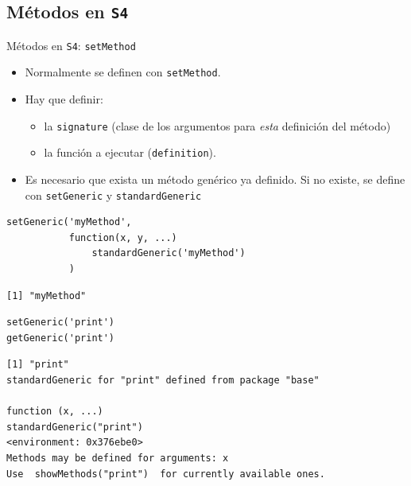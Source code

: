 \documentclass[xcolor={usenames,svgnames,dvipsnames}]{beamer}
\begin{document}
\subsection{Métodos en \texttt{S4}}
\label{sec:orgheadline36}

\begin{frame}[fragile,label={sec:orgheadline32}]{Métodos en \texttt{S4}: \texttt{setMethod}}
 \begin{itemize}
\item Normalmente se definen con \texttt{setMethod}.
\item Hay que definir:
\begin{itemize}
\item la \texttt{signature} (clase de los argumentos para \emph{esta} definición del
método)
\item la función a ejecutar (\texttt{definition}).
\end{itemize}
\item Es necesario que exista un método genérico ya definido. Si no
existe, se define con \texttt{setGeneric} y \texttt{standardGeneric}
\end{itemize}
\lstset{language=R,label= ,caption= ,captionpos=b,numbers=none}
\begin{lstlisting}
setGeneric('myMethod',
           function(x, y, ...)
               standardGeneric('myMethod')
           )
\end{lstlisting}

\begin{verbatim}
[1] "myMethod"
\end{verbatim}

\lstset{language=R,label= ,caption= ,captionpos=b,numbers=none}
\begin{lstlisting}
setGeneric('print')
getGeneric('print')
\end{lstlisting}

\begin{verbatim}
[1] "print"
standardGeneric for "print" defined from package "base"

function (x, ...) 
standardGeneric("print")
<environment: 0x376ebe0>
Methods may be defined for arguments: x
Use  showMethods("print")  for currently available ones.
\end{verbatim}
\end{frame}
\end{document}
